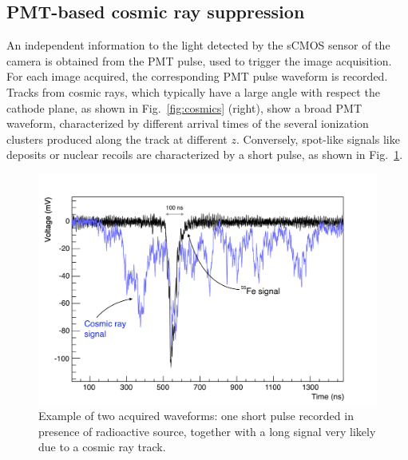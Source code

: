 \subsection{PMT-based cosmic ray suppression}
An independent information to the light detected by the sCMOS sensor
of the camera is obtained from the PMT pulse, used to trigger the
image acquisition. For each image acquired, the corresponding PMT
pulse waveform is recorded.  Tracks from cosmic rays, which typically
have a large angle with respect the cathode plane, as shown in
Fig.~\ref{fig:cosmics} (right), show a broad PMT waveform,
characterized by different arrival times of the several ionization
clusters produced along the track at different $z$. Conversely,
spot-like signals like \fe deposits or nuclear recoils are
characterized by a short pulse, as shown in Fig.~\ref{fig:waveforms}.
%
\begin{figure}[ht]
  \begin{center}
    \includegraphics[width=0.69\linewidth]{figures/Waveforms.png}

    \caption{Example of two acquired waveforms: one short pulse
  recorded in presence of \fe radioactive source, together with a long
  signal very likely due to a cosmic ray
  track.  \label{fig:waveforms}}

  \end{center}
\end{figure}

